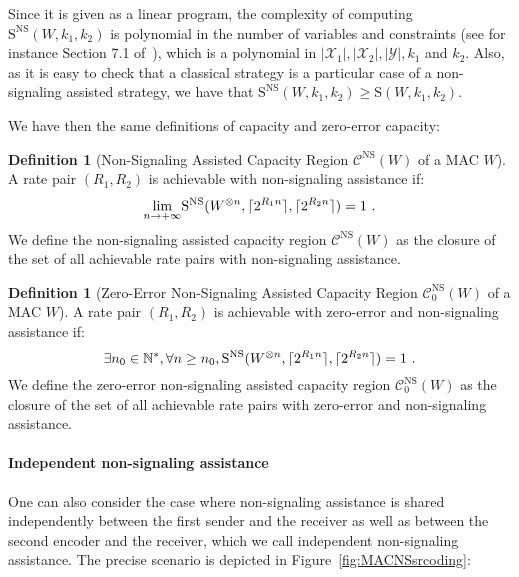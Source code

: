 \documentclass[11pt]{article}
\theoremstyle{definition}
\newtheorem{defi}[theo]{Definition}
\theoremstyle{remark}
\DeclarePairedDelimiter\ceil{\lceil}{\rceil}
\begin{document}
Since it is given as a linear program, the complexity of computing $\mathrm{S}^{\mathrm{NS}}(W,k_1,k_2)$ is polynomial in the number of variables and constraints (see for instance Section 7.1 of~\cite{LinearProgramming}), which is a polynomial in $|\mathcal{X}_1|,|\mathcal{X}_2|,|\mathcal{Y}|,k_1$ and $k_2$. Also, as it is easy to check that a classical strategy is a particular case of a non-signaling assisted strategy, we have that $\mathrm{S}^{\mathrm{NS}}(W,k_1,k_2) \geq \mathrm{S}(W,k_1,k_2)$.

We have then the same definitions of capacity and zero-error capacity:
\begin{defi}[Non-Signaling Assisted Capacity Region $\mathcal{C}^{\mathrm{NS}}(W)$ of a MAC $W$]
  A rate pair $(R_1,R_2)$ is achievable with non-signaling assistance if:
  \[ \underset{n \rightarrow +\infty}{\lim} \mathrm{S}^{\mathrm{NS}}(W^{\otimes n},\ceil{2^{R_1n}},\ceil{2^{R_2n}}) = 1 \ . \]
  We define the non-signaling assisted capacity region $\mathcal{C}^{\mathrm{NS}}(W)$ as the closure of the set of all achievable rate pairs with non-signaling assistance.
\end{defi}

\begin{defi}[Zero-Error Non-Signaling Assisted Capacity Region $\mathcal{C}^{\mathrm{NS}}_0(W)$ of a MAC $W$]
  A rate pair $(R_1,R_2)$ is achievable with zero-error and non-signaling assistance if:
  \[ \exists n_0 \in \mathbb{N}^*, \forall n \geq n_0, \mathrm{S}^{\mathrm{NS}}(W^{\otimes n},\ceil{2^{R_1n}},\ceil{2^{R_2n}}) = 1 \ . \]
  We define the zero-error non-signaling assisted capacity region $\mathcal{C}^{\mathrm{NS}}_0(W)$ as the closure of the set of all achievable rate pairs with zero-error and non-signaling assistance.
\end{defi}

\paragraph{Independent non-signaling assistance} One can also consider the case where non-signaling assistance is shared independently between the first sender and the receiver as well as between the second encoder and the receiver, which we call independent non-signaling assistance. The precise scenario is depicted in Figure~\ref{fig:MACNSsrcoding}:
\end{document}
